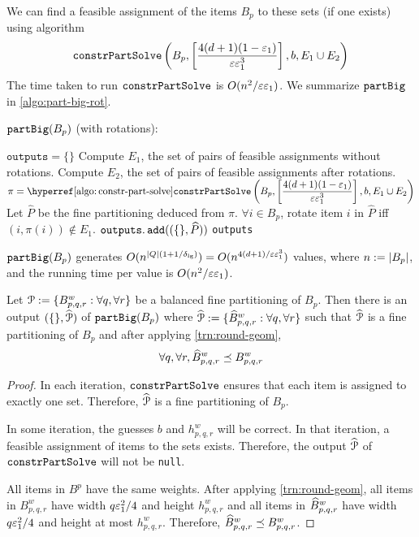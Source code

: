 We can find a feasible assignment of the items $B_p$ to these sets (if one exists) using algorithm
\[ \operatorname{\mathtt{constrPartSolve}}\left(B_p, \left[ \frac{4(d+1)(1-\varepsilon_1)}{\varepsilon\varepsilon_1^3} \right],
    b, E_1 \cup E_2\right) \]
The time taken to run $\operatorname{\mathtt{constrPartSolve}}$ is $O(n^2/\varepsilon\varepsilon_1)$.
We summarize $\operatorname{\mathtt{partBig}}$ in \cref{algo:part-big-rot}.

\begin{algorithm}[htb]
\caption{$\operatorname{\mathtt{partBig}}(B_p)$ (with rotations):}
\label{algo:part-big-rot}
\begin{algorithmic}[1]
\State $\texttt{outputs} = \{\}$
        \State Compute $E_1$, the set of pairs of feasible assignments without rotations.
        \State Compute $E_2$, the set of pairs of feasible assignments after rotations.
        \State $\pi = {\displaystyle \constrPartSolveHyp\left(B_p,
            \left[ \frac{4(d+1)(1-\epsLarge)}{\eps\epsLarge^3} \right], b, E_1 \cup E_2\right) }$
            \State Let $\widehat{P}$ be the fine partitioning deduced from $\pi$.
            \State $\forall i \in B_p$, rotate item $i$ in $\widehat{P}$
                iff $(i, \pi(i)) \not\in E_1$.
            \State $\operatorname{\mathtt{outputs.add}}((\{\}, \widehat{P}))$
        \EndIf
    \EndFor
\EndFor
\State \Return \texttt{outputs}
\end{algorithmic}
\end{algorithm}

\begin{claim}
\label{claim:part-big-rot-time}
$\operatorname{\mathtt{partBig}}(B_p)$ generates $O(n^{|Q|(1+1/\delta_{\mathrm{lg}})}) = O(n^{4(d+1)/\varepsilon\varepsilon_1^3})$
values, where $n := |B_p|$, and the running time per value is $O(n^2/\varepsilon\varepsilon_1)$.
\end{claim}

\begin{lemma}
\label{lem:part-big-rot}
Let $\mathcal{P} := \{B^w_{p,q,r}: \forall q, \forall r\}$
be a balanced fine partitioning of $B_p$.
Then there is an output $(\{\}, \widehat{\mathcal{P}})$ of $\operatorname{\mathtt{partBig}}(B_p)$ where
$\widehat{\mathcal{P}} := \{\widehat{B}^w_{p,q,r}: \forall q, \forall r\}$
such that $\widehat{\mathcal{P}}$ is a fine partitioning of $B_p$ and
after applying \cref{trn:round-geom},
\[ \forall q, \forall r, \widehat{B}^w_{p,q,r} \preceq B^w_{p,q,r} \]
\end{lemma}
\begin{proof}
In each iteration, $\operatorname{\mathtt{constrPartSolve}}$ ensures that each item is assigned to exactly one set.
Therefore, $\widehat{\mathcal{P}}$ is a fine partitioning of $B_p$.

In some iteration, the guesses $b$ and $h^w_{p,q,r}$ will be correct.
In that iteration, a feasible assignment of items to the sets exists.
Therefore, the output $\widehat{\mathcal{P}}$ of $\operatorname{\mathtt{constrPartSolve}}$ will not be \texttt{null}.

All items in $B^p$ have the same weights. After applying \cref{trn:round-geom},
all items in $B^w_{p,q,r}$ have width $q\varepsilon_1^2/4$ and height $h^w_{p,q,r}$
and all items in $\widehat{B}^w_{p,q,r}$ have width $q\varepsilon_1^2/4$ and
height at most $h^w_{p,q,r}$.
Therefore, $\widehat{B}^w_{p,q,r} \preceq B^w_{p,q,r}$.
\end{proof}

